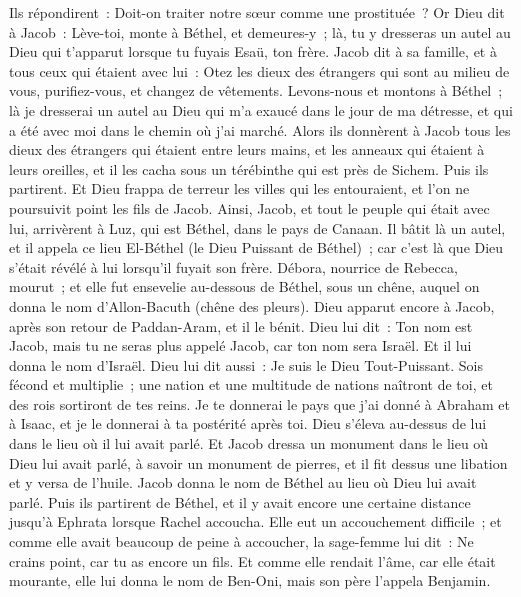 \begin{multicols}{2}
Ils répondirent~: Doit-on traiter notre sœur comme une prostituée~?
\VerseOne{}Or Dieu dit à Jacob~: Lève-toi, monte à Béthel, et demeures-y~; là, tu y dresseras un autel au Dieu qui t'apparut lorsque tu fuyais Esaü, ton frère.
Jacob dit à sa famille, et à tous ceux qui étaient avec lui~: Otez les dieux des étrangers qui sont au milieu de vous, purifiez-vous, et changez de vêtements.
Levons-nous et montons à Béthel~; là je dresserai un autel au Dieu qui m'a exaucé dans le jour de ma détresse, et qui a été avec moi dans le chemin où j'ai marché.
Alors ils donnèrent à Jacob tous les dieux des étrangers qui étaient entre leurs mains, et les anneaux qui étaient à leurs oreilles, et il les cacha sous un térébinthe qui est près de Sichem.
Puis ils partirent. Et Dieu frappa de terreur les villes qui les entouraient, et l'on ne poursuivit point les fils de Jacob.
Ainsi, Jacob, et tout le peuple qui était avec lui, arrivèrent à Luz, qui est Béthel, dans le pays de Canaan.
Il bâtit là un autel, et il appela ce lieu El-Béthel (le Dieu Puissant de Béthel)~; car c'est là que Dieu s'était révélé à lui lorsqu'il fuyait son frère.
Débora, nourrice de Rebecca, mourut~; et elle fut ensevelie au-dessous de Béthel, sous un chêne, auquel on donna le nom d'Allon-Bacuth (chêne des pleurs).
Dieu apparut encore à Jacob, après son retour de Paddan-Aram, et il le bénit.
Dieu lui dit~: Ton nom est Jacob, mais tu ne seras plus appelé Jacob, car ton nom sera Israël. Et il lui donna le nom d'Israël.
Dieu lui dit aussi~: Je suis le Dieu Tout-Puissant. Sois fécond et multiplie~; une nation et une multitude de nations naîtront de toi, et des rois sortiront de tes reins.
Je te donnerai le pays que j'ai donné à Abraham et à Isaac, et je le donnerai à ta postérité après toi.
Dieu s'éleva au-dessus de lui dans le lieu où il lui avait parlé.
Et Jacob dressa un monument dans le lieu où Dieu lui avait parlé, à savoir un monument de pierres, et il fit dessus une libation et y versa de l'huile.
Jacob donna le nom de Béthel au lieu où Dieu lui avait parlé.
Puis ils partirent de Béthel, et il y avait encore une certaine distance jusqu'à Ephrata lorsque Rachel accoucha. Elle eut un accouchement difficile~;
et comme elle avait beaucoup de peine à accoucher, la sage-femme lui dit~: Ne crains point, car tu as encore un fils.
Et comme elle rendait l'âme, car elle était mourante, elle lui donna le nom de Ben-Oni, mais son père l'appela Benjamin.

\end{multicols}
